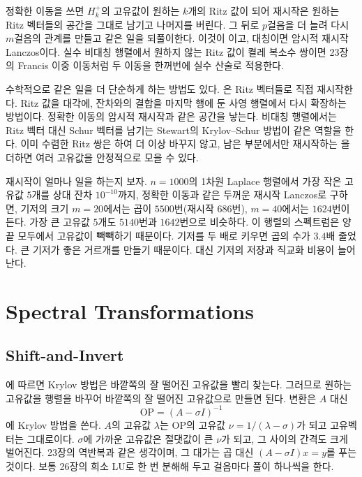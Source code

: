 정확한 이동을 쓰면 $H^+_k$의 고유값이 원하는 $k$개의 Ritz 값이 되어 재시작은 원하는 Ritz 벡터들의 공간을 그대로 남기고 나머지를 버린다. 그 뒤로 $p$걸음을 더 늘려 다시 $m$걸음의 관계를 만들고 같은 일을 되풀이한다. 이것이 이고, 대칭이면 암시적 재시작 Lanczos이다\cite{calvetti1994restart}. 실수 비대칭 행렬에서 원하지 않는 Ritz 값이 켤레 복소수 쌍이면 23장의 Francis 이중 이동처럼 두 이동을 한꺼번에 실수 산술로 적용한다.

수학적으로 같은 일을 더 단순하게 하는 방법도 있다. 은 Ritz 벡터들로 직접 재시작한다. Ritz 값을 대각에, 잔차와의 결합을 마지막 행에 둔  사영 행렬에서 다시 확장하는 방법이다\cite{wu2000thick}. 정확한 이동의 암시적 재시작과 같은 공간을 낳는다. 비대칭 행렬에서는 Ritz 벡터 대신 Schur 벡터를 남기는 Stewart의 Krylov--Schur 방법이 같은 역할을 한다\cite{stewart2001krylovschur}. 이미 수렴한 Ritz 쌍은 하여 더 이상 바꾸지 않고, 남은 부분에서만 재시작하는 을 더하면 여러 고유값을 안정적으로 모을 수 있다\cite{lehoucq1996deflation}.

재시작이 얼마나 일을 하는지 보자. $n=1000$의 1차원 Laplace 행렬에서 가장 작은 고유값 $5$개를 상대 잔차 $10^{-10}$까지, 정확한 이동과 같은 두꺼운 재시작 Lanczos로 구하면, 기저의 크기 $m=20$에서는 곱이 $5500$번(재시작 $686$번), $m=40$에서는 $1624$번이 든다. 가장 큰 고유값 $5$개도 $5140$번과 $1642$번으로 비슷하다. 이 행렬의 스펙트럼은 양 끝 모두에서 고유값이 빽빽하기 때문이다. 기저를 두 배로 키우면 곱의 수가 $3.4$배 줄었다. 큰 기저가 좋은 거르개를 만들기 때문이다. 대신 기저의 저장과 직교화 비용이 늘어난다.

\section{Spectral Transformations}
\label{sec:spectral-transform}

\subsection{Shift-and-Invert}

에 따르면 Krylov 방법은 바깥쪽의 잘 떨어진 고유값을 빨리 찾는다. 그러므로 원하는 고유값을 행렬을 바꾸어 바깥쪽의 잘 떨어진 고유값으로 만들면 된다.  변환은 $A$ 대신
\[
\mathrm{OP}=(A-\sigma I)^{-1}
\]
에 Krylov 방법을 쓴다. $A$의 고유값 $\lambda$는 $\mathrm{OP}$의 고유값 $\nu=1/(\lambda-\sigma)$가 되고 고유벡터는 그대로이다. $\sigma$에 가까운 고유값은 절댓값이 큰 $\nu$가 되고, 그 사이의 간격도 크게 벌어진다. 23장의 역반복과 같은 생각이며, 그 대가는 곱 대신 $(A-\sigma I)x=y$를 푸는 것이다. 보통 26장의 희소 LU로 한 번 분해해 두고 걸음마다 풀이 하나씩을 한다\cite{ericsson1980spectral}.

